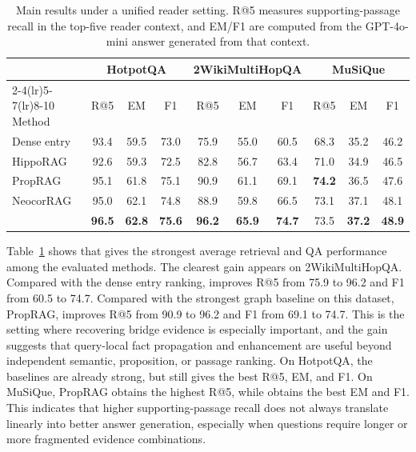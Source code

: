 \begin{table}[t]
\centering
\small
\begin{tabular}{lccc ccc ccc}
\toprule
& \multicolumn{3}{c}{HotpotQA} &
\multicolumn{3}{c}{2WikiMultiHopQA} &
\multicolumn{3}{c}{MuSiQue} \\
\cmidrule(lr){2-4}\cmidrule(lr){5-7}\cmidrule(lr){8-10}
Method & R@5 & EM & F1 & R@5 & EM & F1 & R@5 & EM & F1 \\
\midrule
Dense entry & 93.4 & 59.5 & 73.0 & 75.9 & 55.0 & 60.5 & 68.3 & 35.2 & 46.2 \\
HippoRAG & 92.6 & 59.3 & 72.5 & 82.8 & 56.7 & 63.4 & 71.0 & 34.9 & 46.5 \\
PropRAG & 95.1 & 61.8 & 75.1 & 90.9 & 61.1 & 69.1 & \textbf{74.2} & 36.5 & 47.6 \\
NeocorRAG & 95.0 & 62.1 & 74.8 & 88.9 & 59.8 & 66.5 & 73.1 & 37.1 & 48.1 \\
\methodname{} & \textbf{96.5} & \textbf{62.8} & \textbf{75.6}
& \textbf{96.2} & \textbf{65.9} & \textbf{74.7}
& 73.5 & \textbf{37.2} & \textbf{48.9} \\
\bottomrule
\end{tabular}
\caption{Main results under a unified reader setting. R@5 measures
supporting-passage recall in the top-five reader context, and EM/F1 are
computed from the GPT-4o-mini answer generated from that context.}
\label{tab:main-results}
\end{table}

Table~\ref{tab:main-results} shows that \methodname{} gives the strongest
average retrieval and QA performance among the evaluated methods. The
clearest gain appears on 2WikiMultiHopQA. Compared with the dense entry
ranking, \methodname{} improves R@5 from 75.9 to 96.2 and F1 from 60.5
to 74.7. Compared with the strongest graph baseline on this dataset,
PropRAG, \methodname{} improves R@5 from 90.9 to 96.2 and F1 from 69.1
to 74.7. This is the setting where recovering bridge evidence is
especially important, and the gain suggests that query-local fact
propagation and enhancement are useful beyond independent semantic,
proposition, or passage ranking. On HotpotQA, the baselines are already
strong, but \methodname{} still gives the best R@5, EM, and F1. On
MuSiQue, PropRAG obtains the highest R@5, while \methodname{} obtains
the best EM and F1. This indicates that higher supporting-passage recall
does not always translate linearly into better answer generation,
especially when questions require longer or more fragmented evidence
combinations.


